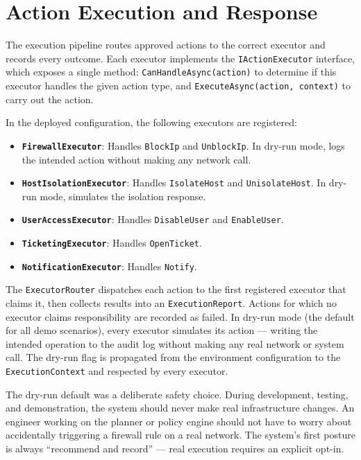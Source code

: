 \section{Action Execution and Response}
\label{sec:impl-execution}

The execution pipeline routes approved actions to the correct executor and records every outcome. Each executor implements the \texttt{IActionExecutor} interface, which exposes a single method: \texttt{CanHandleAsync(action)} to determine if this executor handles the given action type, and \texttt{ExecuteAsync(action, context)} to carry out the action.

In the deployed configuration, the following executors are registered:

\begin{itemize}
    \item \textbf{\texttt{FirewallExecutor}}: Handles \texttt{BlockIp} and \texttt{UnblockIp}. In dry-run mode, logs the intended action without making any network call.
    \item \textbf{\texttt{HostIsolationExecutor}}: Handles \texttt{IsolateHost} and \texttt{UnisolateHost}. In dry-run mode, simulates the isolation response.
    \item \textbf{\texttt{UserAccessExecutor}}: Handles \texttt{DisableUser} and \texttt{EnableUser}.
    \item \textbf{\texttt{TicketingExecutor}}: Handles \texttt{OpenTicket}.
    \item \textbf{\texttt{NotificationExecutor}}: Handles \texttt{Notify}.
\end{itemize}

The \texttt{ExecutorRouter} dispatches each action to the first registered executor that claims it, then collects results into an \texttt{ExecutionReport}. Actions for which no executor claims responsibility are recorded as failed. In dry-run mode (the default for all demo scenarios), every executor simulates its action --- writing the intended operation to the audit log without making any real network or system call. The dry-run flag is propagated from the environment configuration to the \texttt{ExecutionContext} and respected by every executor.

The dry-run default was a deliberate safety choice. During development, testing, and demonstration, the system should never make real infrastructure changes. An engineer working on the planner or policy engine should not have to worry about accidentally triggering a firewall rule on a real network. The system's first posture is always ``recommend and record'' --- real execution requires an explicit opt-in.

